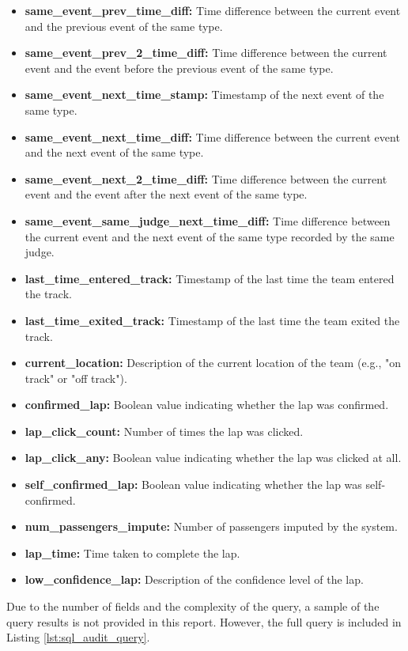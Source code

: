 \documentclass[11pt]{article}
\begin{document}
\begin{itemize}
    \item \textbf{same\_event\_prev\_time\_diff:} Time difference between the current event and the previous event of the same type.
    \item \textbf{same\_event\_prev\_2\_time\_diff:} Time difference between the current event and the event before the previous event of the same type.
    \item \textbf{same\_event\_next\_time\_stamp:} Timestamp of the next event of the same type.
    \item \textbf{same\_event\_next\_time\_diff:} Time difference between the current event and the next event of the same type.
    \item \textbf{same\_event\_next\_2\_time\_diff:} Time difference between the current event and the event after the next event of the same type.
    \item \textbf{same\_event\_same\_judge\_next\_time\_diff:} Time difference between the current event and the next event of the same type recorded by the same judge.
    \item \textbf{last\_time\_entered\_track:} Timestamp of the last time the team entered the track.
    \item \textbf{last\_time\_exited\_track:} Timestamp of the last time the team exited the track.
    \item \textbf{current\_location:} Description of the current location of the team (e.g., "on track" or "off track").
    \item \textbf{confirmed\_lap:} Boolean value indicating whether the lap was confirmed.
    \item \textbf{lap\_click\_count:} Number of times the lap was clicked.
    \item \textbf{lap\_click\_any:} Boolean value indicating whether the lap was clicked at all.
    \item \textbf{self\_confirmed\_lap:} Boolean value indicating whether the lap was self-confirmed.
    \item \textbf{num\_passengers\_impute:} Number of passengers imputed by the system.
    \item \textbf{lap\_time:} Time taken to complete the lap.
    \item \textbf{low\_confidence\_lap:} Description of the confidence level of the lap.
\end{itemize}

Due to the number of fields and the complexity of the query, a sample of the query results is not provided in this report. However, the full query is included in Listing \ref{lst:sql_audit_query}.
\end{document}
